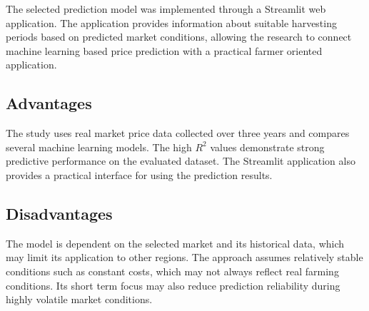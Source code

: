 The selected prediction model was implemented through a Streamlit web application. The application provides information about suitable harvesting periods based on predicted market conditions, allowing the research to connect machine learning based price prediction with a practical farmer oriented application.

\subsection{Advantages}

The study uses real market price data collected over three years and compares several machine learning models. The high $R^2$ values demonstrate strong predictive performance on the evaluated dataset. The Streamlit application also provides a practical interface for using the prediction results.

\subsection{Disadvantages}

The model is dependent on the selected market and its historical data, which may limit its application to other regions. The approach assumes relatively stable conditions such as constant costs, which may not always reflect real farming conditions. Its short term focus may also reduce prediction reliability during highly volatile market conditions.

